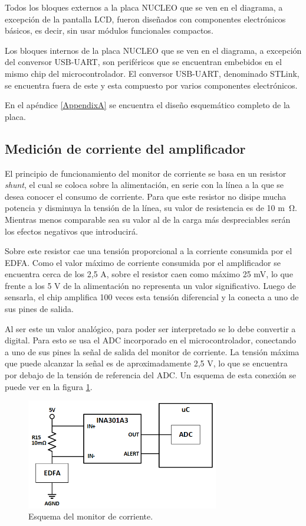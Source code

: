 Todos los bloques externos a la placa NUCLEO que se ven en el diagrama, a excepción de la pantalla LCD, fueron diseñados con componentes electrónicos básicos, es decir, sin usar módulos funcionales compactos.

Los bloques internos de la placa NUCLEO que se ven en el diagrama, a excepción del conversor USB-UART, son periféricos que se encuentran embebidos en el mismo chip del microcontrolador. El conversor USB-UART, denominado STLink, se encuentra fuera de este y esta compuesto por varios componentes electrónicos.

En el apéndice \ref{AppendixA} se encuentra el diseño esquemático completo de la placa.

\subsection{Medición de corriente del amplificador}

El principio de funcionamiento del monitor de corriente se basa en un resistor \textit{shunt}, el cual se coloca sobre la alimentación, en serie con la línea a la que se desea conocer el consumo de corriente. Para que este resistor no disipe mucha potencia y disminuya la tensión de la línea, su valor de resistencia es de 10 \si{m\ohm}. Mientras menos comparable sea su valor al de la carga más despreciables serán los efectos negativos que introducirá.

Sobre este resistor cae una tensión proporcional a la corriente consumida por el EDFA. Como el valor máximo de corriente consumida por el amplificador se encuentra cerca de los 2,5 A, sobre el resistor caen como máximo 25 mV, lo que frente a los 5 V de la alimentación no representa un valor significativo. Luego de sensarla, el chip amplifica 100 veces esta tensión diferencial y la conecta a uno de sus pines de salida.

Al ser este un valor analógico, para poder ser interpretado se lo debe convertir a digital. Para esto se usa el ADC incorporado en el microcontrolador, conectando a uno de sus pines la señal de salida del monitor de corriente. La tensión máxima que puede alcanzar la señal es de aproximadamente 2,5 V, lo que se encuentra por debajo de la tensión de referencia del ADC. Un esquema de esta conexión se puede ver en la figura \ref{fig:funcMonitor}.

\begin{figure}[H]
\centering
\includegraphics[width=0.75\textwidth]{./Figures/func_monitor.png}
\caption{Esquema del monitor de corriente.}
\label{fig:funcMonitor}
\end{figure}


